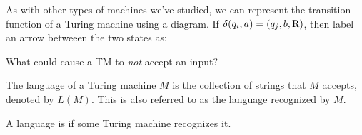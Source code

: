 \documentclass[twoside,letterpaper,openany]{book}
\begin{document}
\begin{discussion}
As with other types of machines we've studied, we can represent the transition function of a Turing machine using a diagram. If $\delta(q_i, a) = (q_j, b, \textrm{R})$, then label an arrow betweeen the two states as:
\begin{center}
\end{center}
\end{discussion}

\begin{exer1}
What could cause a TM to \emph{not} accept an input?
\end{exer1}

\begin{defn}
The language of a Turing machine $M$ is the collection of strings that $M$ accepts, denoted by $L(M)$. This is also referred to as the language recognized by $M$.
\end{defn}

\begin{defn}
A language is  if some Turing machine recognizes it.
\end{defn}
\end{document}
